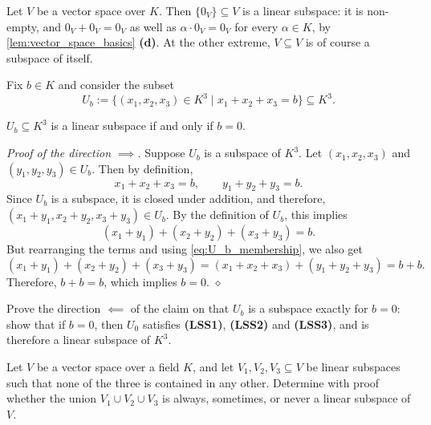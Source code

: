\begin{example}
\label{ex:trivial_subspace}
Let $V$ be a vector space over $K$. Then $\{0_V\} \subseteq V$ is a linear subspace: it is non-empty, and $0_V + 0_V = 0_V$ as well as $\alpha \cdot 0_V = 0_V$ for every $\alpha \in K$, by \cref{lem:vector_space_basics} \textbf{(d)}. At the other extreme, $V \subseteq V$ is of course a subspace of itself.
\end{example}

\begin{example}
\label{ex:plane_subspace}
Fix $b \in K$ and consider the subset
\[
U_b := \{(x_1, x_2, x_3) \in K^3 \mid x_1 + x_2 + x_3 = b\} \subseteq K^3.
\]

\begin{claim*}[$U_b$ is a subspace exactly for $b = 0$]
\label{claim:U_b_subspace}
$U_b \subseteq K^3$ is a linear subspace if and only if $b = 0$.
\end{claim*}

\emph{Proof of the direction $\implies$.} Suppose $U_b$ is a subspace of $K^3$. Let $(x_1, x_2, x_3)$ and $(y_1, y_2, y_3) \in U_b$. Then by definition,
\begin{equation} \label{eq:U_b_membership}
x_1 + x_2 + x_3 = b, \qquad y_1 + y_2 + y_3 = b.
\end{equation}
Since $U_b$ is a subspace, it is closed under addition, and therefore, $(x_1 + y_1, x_2 + y_2, x_3 + y_3) \in U_b$. By the definition of $U_b$, this implies
\[
(x_1 + y_1) + (x_2 + y_2) + (x_3 + y_3) = b.
\]
But rearranging the terms and using \eqref{eq:U_b_membership}, we also get
\[
(x_1 + y_1) + (x_2 + y_2) + (x_3 + y_3) = (x_1 + x_2 + x_3) + (y_1 + y_2 + y_3) = b + b.
\]
Therefore, $b + b = b$, which implies $b = 0$. \hfill $\diamond$
\end{example}

\begin{exercise}
\label{exc:U_b_converse}
Prove the direction $\impliedby$ of the claim on  that $U_b$ is a subspace exactly for $b = 0$: show that if $b = 0$, then $U_0$ satisfies \textbf{(LSS1)}, \textbf{(LSS2)} and \textbf{(LSS3)}, and is therefore a linear subspace of $K^3$.
\end{exercise}

\begin{exercise}
\label{exc:union_three_subspaces}
Let $V$ be a vector space over a field $K$, and let $V_1, V_2, V_3 \subseteq V$ be linear subspaces such that none of the three is contained in any other.
Determine with proof whether the union $V_1 \cup V_2 \cup V_3$ is always, sometimes, or never a linear subspace of $V$.
\end{exercise}

